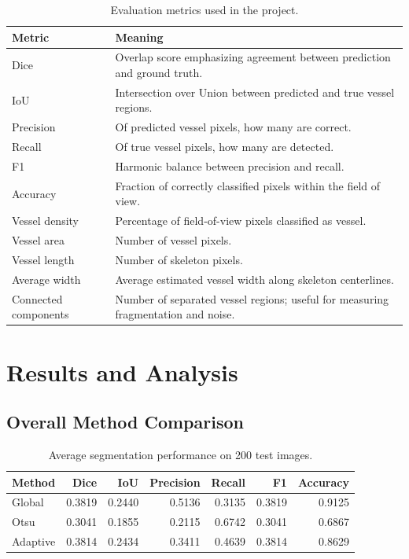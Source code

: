 \documentclass[12pt,a4paper]{article}
\begin{document}
\begin{table}[H]
\centering
\caption{Evaluation metrics used in the project.}
\begin{tabular}{p{4cm} p{9.5cm}}
\toprule
\textbf{Metric} & \textbf{Meaning}\\
\midrule
Dice & Overlap score emphasizing agreement between prediction and ground truth.\\
IoU & Intersection over Union between predicted and true vessel regions.\\
Precision & Of predicted vessel pixels, how many are correct.\\
Recall & Of true vessel pixels, how many are detected.\\
F1 & Harmonic balance between precision and recall.\\
Accuracy & Fraction of correctly classified pixels within the field of view.\\
Vessel density & Percentage of field-of-view pixels classified as vessel.\\
Vessel area & Number of vessel pixels.\\
Vessel length & Number of skeleton pixels.\\
Average width & Average estimated vessel width along skeleton centerlines.\\
Connected components & Number of separated vessel regions; useful for measuring fragmentation and noise.\\
\bottomrule
\end{tabular}
\end{table}

\section{Results and Analysis}
\subsection{Overall Method Comparison}

\begin{table}[H]
\centering
\caption{Average segmentation performance on 200 test images.}
\begin{tabular}{lrrrrrr}
\toprule
\textbf{Method} & \textbf{Dice} & \textbf{IoU} & \textbf{Precision} & \textbf{Recall} & \textbf{F1} & \textbf{Accuracy}\\
\midrule
Global & 0.3819 & 0.2440 & 0.5136 & 0.3135 & 0.3819 & 0.9125\\
Otsu & 0.3041 & 0.1855 & 0.2115 & 0.6742 & 0.3041 & 0.6867\\
Adaptive & 0.3814 & 0.2434 & 0.3411 & 0.4639 & 0.3814 & 0.8629\\
\bottomrule
\end{tabular}
\end{table}
\end{document}
